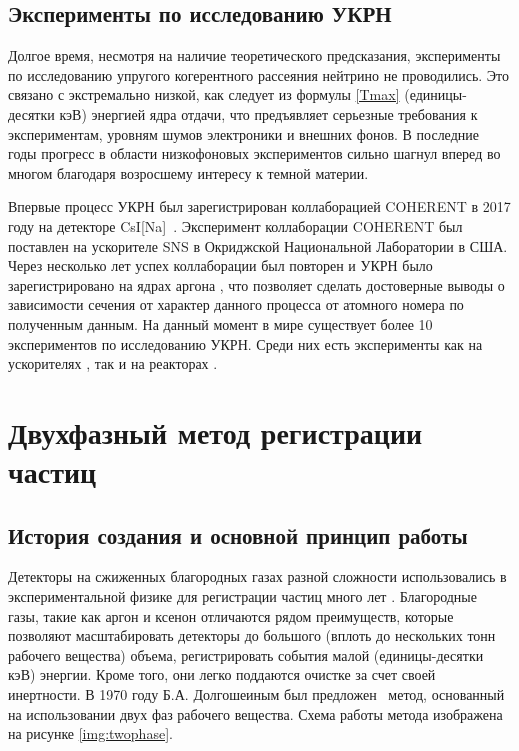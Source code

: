 \subsection{Эксперименты по исследованию УКРН}
\label{subsect1_1_2}
Долгое время, несмотря на наличие теоретического предсказания, эксперименты по исследованию упругого когерентного рассеяния нейтрино не проводились. Это связано с экстремально низкой, как следует из формулы \ref{Tmax} (единицы-десятки кэВ) энергией ядра отдачи, что предъявляет серьезные требования к экспериментам, уровням шумов электроники и внешних фонов. В последние годы прогресс в области низкофоновых экспериментов сильно шагнул вперед во многом благодаря возросшему интересу к темной материи. 
\par Впервые процесс УКРН был зарегистрирован коллаборацией COHERENT в 2017 году на детекторе CsI[Na]~\cite{COHERENT:2017ipa}. Эксперимент коллаборации COHERENT был поставлен на ускорителе SNS в Окриджской Национальной Лаборатории в США. %
Через несколько лет успех коллаборации был повторен и УКРН было зарегистрировано на ядрах аргона \cite{PhysRevLett.126.012002}, что позволяет сделать достоверные выводы о зависимости сечения от характер данного процесса от атомного номера по полученным данным. На данный момент в мире существует более 10 экспериментов по исследованию УКРН. Среди них есть эксперименты как на ускорителях \cite{COHERENT:2018gft}, так и на реакторах \cite{Belov_2015, Aguilar-Arevalo_2016, ricochet, Buck_2020, Singh:2016glu, Strauss_2020, Chaudhuri:2022pqk}. 

\section{Двухфазный метод регистрации частиц} 
\label{sect1_2} 
\subsection{История создания и основной принцип работы}
\label{sect1_2_1}
Детекторы на сжиженных благородных газах разной сложности использовались в экспериментальной физике для регистрации частиц много лет \cite{Chepel_2013}. Благородные газы, такие как аргон и ксенон отличаются рядом преимуществ, которые позволяют масштабировать детекторы до большого (вплоть до нескольких тонн рабочего вещества) объема, регистрировать события малой (единицы-десятки кэВ) энергии. Кроме того, они легко поддаются очистке за счет своей инертности.  В 1970 году Б.А. Долгошеиным был предложен~\cite{Dolgoshein} метод, основанный на использовании двух фаз рабочего вещества. Схема работы метода изображена на рисунке \ref{img:twophase}.

